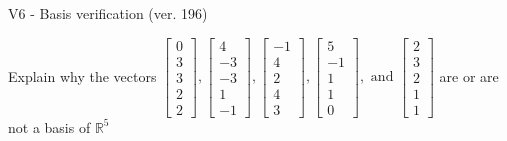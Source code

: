 \begin{exercise}
  \begin{exerciseTitle}V6 - Basis verification (ver. 196)\end{exerciseTitle}
  \begin{exerciseStatement}
    Explain why the vectors \(\left[\begin{array}{r}
0 \\
3 \\
3 \\
2 \\
2
\end{array}\right] , \left[\begin{array}{r}
4 \\
-3 \\
-3 \\
1 \\
-1
\end{array}\right] , \left[\begin{array}{r}
-1 \\
4 \\
2 \\
4 \\
3
\end{array}\right] , \left[\begin{array}{r}
5 \\
-1 \\
1 \\
1 \\
0
\end{array}\right] , \text{ and } \left[\begin{array}{r}
2 \\
3 \\
2 \\
1 \\
1
\end{array}\right]\) are or are not a basis of \(\mathbb{R}^5\)	



\end{exerciseStatement}
\end{exercise}

